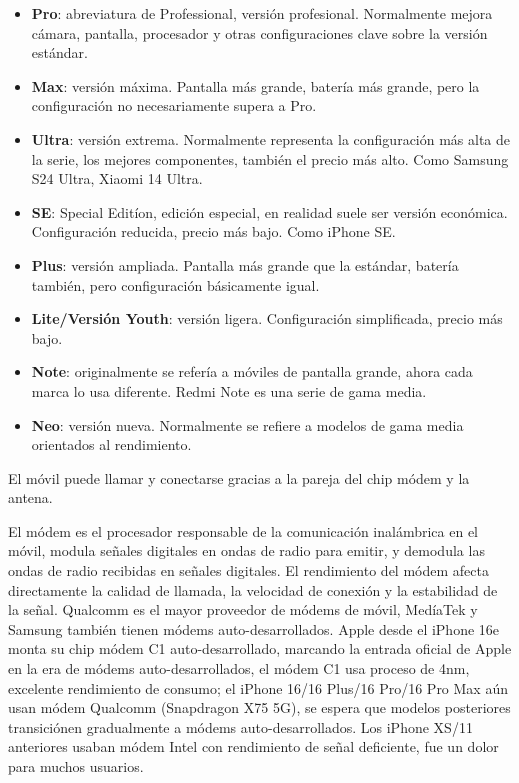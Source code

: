 
\begin{itemize}
  \item \textbf{Pro}: abreviatura de Professional, versión profesional. Normalmente mejora cámara, pantalla, procesador y otras configuraciones clave sobre la versión estándar.
  \item \textbf{Max}: versión máxima. Pantalla más grande, batería más grande, pero la configuración no necesariamente supera a Pro.
  \item \textbf{Ultra}: versión extrema. Normalmente representa la configuración más alta de la serie, los mejores componentes, también el precio más alto. Como Samsung S24 Ultra, Xiaomi 14 Ultra.
  \item \textbf{SE}: Special Editíon, edición especial, en realidad suele ser versión económica. Configuración reducida, precio más bajo. Como iPhone SE.
  \item \textbf{Plus}: versión ampliada. Pantalla más grande que la estándar, batería también, pero configuración básicamente igual.
  \item \textbf{Lite/Versión Youth}: versión ligera. Configuración simplificada, precio más bajo.
  \item \textbf{Note}: originalmente se refería a móviles de pantalla grande, ahora cada marca lo usa diferente. Redmi Note es una serie de gama media.
  \item \textbf{Neo}: versión nueva. Normalmente se refiere a modelos de gama media orientados al rendimiento.
\end{itemize}


El móvil puede llamar y conectarse gracias a la pareja del chip módem y la antena.


El módem es el procesador responsable de la comunicación inalámbrica en el móvil, modula señales digitales en ondas de radio para emitir, y demodula las ondas de radio recibidas en señales digitales. El rendimiento del módem afecta directamente la calidad de llamada, la velocidad de conexión y la estabilidad de la señal. Qualcomm es el mayor proveedor de módems de móvil, MedíaTek y Samsung también tienen módems auto-desarrollados. Apple desde el iPhone 16e monta su chip módem C1 auto-desarrollado, marcando la entrada oficial de Apple en la era de módems auto-desarrollados, el módem C1 usa proceso de 4nm, excelente rendimiento de consumo; el iPhone 16/16 Plus/16 Pro/16 Pro Max aún usan módem Qualcomm (Snapdragon X75 5G), se espera que modelos posteriores transiciónen gradualmente a módems auto-desarrollados. Los iPhone XS/11 anteriores usaban módem Intel con rendimiento de señal deficiente, fue un dolor para muchos usuarios.

